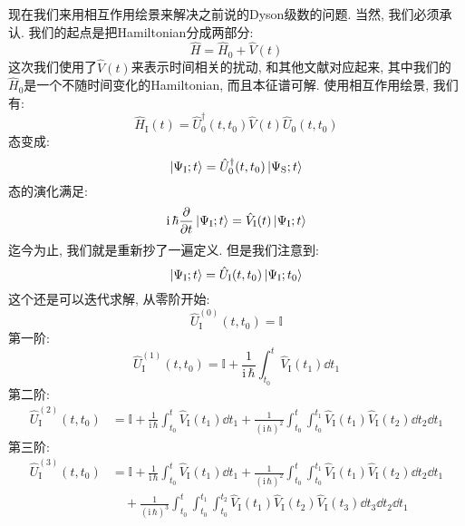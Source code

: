 现在我们来用相互作用绘景来解决之前说的Dyson级数的问题.
当然, 我们必须承认.
我们的起点是把Hamiltonian分成两部分:
\begin{equation}
  \hat{H} = \hat{H}_0 + \hat{V}(t)
\end{equation}
这次我们使用了$\hat{V}(t)$来表示时间相关的扰动, 和其他文献对应起来, 其中我们的$\hat{H}_0$是一个不随时间变化的Hamiltonian, 而且本征谱可解.
使用相互作用绘景, 我们有:
\begin{equation}
  \hat{H}_{\text{I}}(t) = \hat{U}_0^\dagger(t,t_0) \hat{V}(t) \hat{U}_0(t,t_0)
\end{equation}
态变成:
\begin{equation}
  \ket{\Psi_{\text{I}};t} = \hat{U}_0^\dagger(t,t_0) \ket{\Psi_{\text{S}};t}
\end{equation}
态的演化满足:
\begin{equation}
  \mathrm{i}\,\hbar \pdv{}{t} \ket{\Psi_{\text{I}};t} = \hat{V}_{\text{I}}(t) \ket{\Psi_{\text{I}};t}
\end{equation}
迄今为止, 我们就是重新抄了一遍定义.
但是我们注意到:
\begin{equation}
  \ket{\Psi_{\text{I}};t} = \hat{U}_{\text{I}}(t,t_0) \ket{\Psi_{\text{I}};t_0}
\end{equation}
这个还是可以迭代求解, 从零阶开始:
\begin{equation}
  \hat{U}_{\text{I}}^{(0)}(t,t_0) = \mathbb{I}
\end{equation}
第一阶:
\begin{equation}
  \hat{U}_{\text{I}}^{(1)}(t,t_0) = \mathbb{I} + \frac{1}{\mathrm{i}\,\hbar} \int_{t_0}^{t} \hat{V}_{\text{I}}(t_1) \dd{t_1}
\end{equation}
第二阶:
\begin{align}
  \hat{U}_{\text{I}}^{(2)}(t,t_0) &= \mathbb{I} + \frac{1}{\mathrm{i}\,\hbar} \int_{t_0}^{t} \hat{V}_{\text{I}}(t_1) \dd{t_1} + \frac{1}{(\mathrm{i}\,\hbar)^2} \int_{t_0}^{t} \int_{t_0}^{t_1} \hat{V}_{\text{I}}(t_1) \hat{V}_{\text{I}}(t_2) \dd{t_2} \dd{t_1}
\end{align}
第三阶:
\begin{align}
  \hat{U}_{\text{I}}^{(3)}(t,t_0) &= \mathbb{I} + \frac{1}{\mathrm{i}\,\hbar} \int_{t_0}^{t} \hat{V}_{\text{I}}(t_1) \dd{t_1} + \frac{1}{(\mathrm{i}\,\hbar)^2} \int_{t_0}^{t} \int_{t_0}^{t_1} \hat{V}_{\text{I}}(t_1) \hat{V}_{\text{I}}(t_2) \dd{t_2} \dd{t_1} \\
  &\quad + \frac{1}{(\mathrm{i}\,\hbar)^3} \int_{t_0}^{t} \int_{t_0}^{t_1} \int_{t_0}^{t_2} \hat{V}_{\text{I}}(t_1) \hat{V}_{\text{I}}(t_2) \hat{V}_{\text{I}}(t_3) \dd{t_3} \dd{t_2} \dd{t_1}
\end{align}
